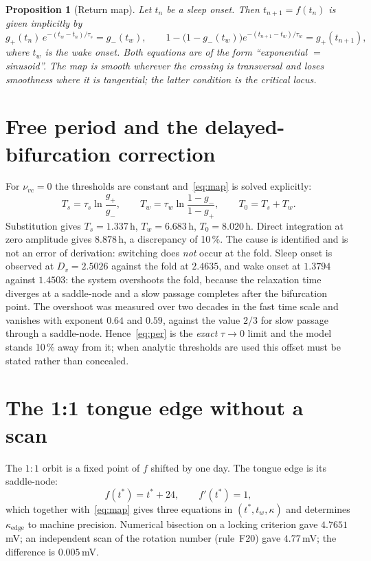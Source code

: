 \documentclass[11pt,a4paper]{article}
\newtheorem{prop}{Proposition}
\begin{document}
\begin{prop}[Return map]\label{prop:map}
Let $t_n$ be a sleep onset. Then $t_{n+1}=f(t_n)$ is given implicitly by
\begin{equation}\label{eq:map}
g_+(t_n)\,e^{-(t_w-t_n)/\tau_s}=g_-(t_w),\qquad
1-\bigl(1-g_-(t_w)\bigr)e^{-(t_{n+1}-t_w)/\tau_w}=g_+(t_{n+1}),
\end{equation}
where $t_w$ is the wake onset. Both equations are of the form ``exponential $=$ sinusoid''. The map
is smooth wherever the crossing is transversal and loses smoothness where it is tangential; the
latter condition is the critical locus.
\end{prop}

\section{Free period and the delayed-bifurcation correction}
For $\nu_{vc}=0$ the thresholds are constant and~\eqref{eq:map} is solved explicitly:
\begin{equation}\label{eq:per}
T_s=\tau_s\ln\frac{g_+}{g_-},\qquad
T_w=\tau_w\ln\frac{1-g_-}{1-g_+},\qquad T_0=T_s+T_w .
\end{equation}
Substitution gives $T_s=1.337$\,h, $T_w=6.683$\,h, $T_0=8.020$\,h. Direct integration at zero
amplitude gives $8.878$\,h, a discrepancy of 10\,\%. The cause is identified and is not an error of
derivation: switching does \emph{not} occur at the fold. Sleep onset is observed at $D_v=2.5026$
against the fold at $2.4635$, and wake onset at $1.3794$ against $1.4503$: the system overshoots the
fold, because the relaxation time diverges at a saddle-node and a slow passage completes after the
bifurcation point. The overshoot was measured over two decades in the fast time scale and vanishes
with exponent $0.64$ and $0.59$, against the value $2/3$ for slow passage through a saddle-node.
Hence~\eqref{eq:per} is the \emph{exact} $\tau\to0$ limit and the model stands 10\,\% away from it;
when analytic thresholds are used this offset must be stated rather than concealed.

\section{The 1:1 tongue edge without a scan}
The $1{:}1$ orbit is a fixed point of $f$ shifted by one day. The tongue edge is its saddle-node:
\begin{equation}\label{eq:edge}
f(t^*)=t^*+24,\qquad f'(t^*)=1,
\end{equation}
which together with~\eqref{eq:map} gives three equations in $(t^*,t_w,\kappa)$ and determines
$\kappa_{\mathrm{edge}}$ to machine precision. Numerical bisection on a locking criterion gave
$4.7651$\,mV; an independent scan of the rotation number (rule~F20) gave $4.77$\,mV; the difference
is $0.005$\,mV.
\end{document}
